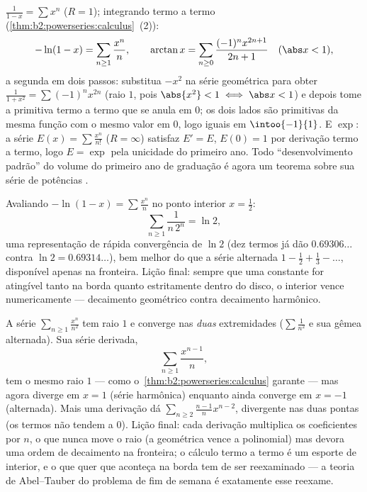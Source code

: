 \begin{example}\label{ex:b2:powerseries:classics}
$\displaystyle\frac{1}{1 - x} = \sum x^n$ ($R = 1$); integrando
termo a termo (\cref{thm:b2:powerseries:calculus}~(2)):
\[
-\ln(1 - x) = \sum_{n\geq1} \frac{x^n}{n},
\qquad
\arctan x = \sum_{n \geq 0} \frac{(-1)^n x^{2n+1}}{2n+1}
\quad (\abs x < 1),
\]
a segunda em dois passos: substitua $-x^2$ na série
geométrica para obter $\frac{1}{1+x^2} = \sum(-1)^nx^{2n}$ (raio
$1$, pois $\abs{x^2} < 1 \iff \abs x < 1$) e depois tome a
primitiva termo a termo que se anula em $0$; os dois lados são
primitivas da mesma função com o mesmo valor em $0$,
logo iguais em $\intoo{-1}{1}$. E $\exp$:
a série $E(x) = \sum \frac{x^n}{n!}$ ($R = \infty$) satisfaz
$E' = E$, $E(0) = 1$ por derivação termo a termo, logo $E = \exp$ pela
unicidade do primeiro ano. Todo ``desenvolvimento padrão'' do volume do primeiro
ano de graduação é agora um teorema sobre sua série de potências .
\end{example}

\begin{example}\label{ex:b2:powerseries:lntwo}
Avaliando $-\ln(1-x) = \sum\frac{x^n}{n}$ no ponto
interior $x = \frac12$:
\[
\sum_{n\geq1}\frac{1}{n\,2^n} = \ln 2 ,
\]
uma representação de rápida convergência de $\ln 2$ (dez termos já
dão $0.69306\ldots$ contra $\ln 2 = 0.69314\ldots$), bem
melhor do que a série alternada $1 - \frac12 + \frac13 -
\dots$, disponível apenas na fronteira. Lição final:
sempre que uma constante for atingível tanto na borda quanto estritamente
dentro do disco, o interior vence numericamente --- decaimento
geométrico contra decaimento harmônico.
\end{example}

\begin{example}\label{ex:b2:powerseries:boundaryloss}
A série $\sum_{n\geq1}\frac{x^n}{n^2}$ tem raio $1$ e
converge nas \emph{duas} extremidades ($\sum\frac1{n^2}$ e sua
gêmea alternada). Sua série derivada,
\[
\sum_{n\geq1}\frac{x^{n-1}}{n} ,
\]
tem o mesmo raio $1$ --- como
o~\cref{thm:b2:powerseries:calculus} garante --- mas agora
diverge em $x = 1$ (série harmônica) enquanto ainda converge
em $x = -1$ (alternada). Mais uma derivação dá
$\sum_{n\geq2}\frac{n-1}{n}x^{n-2}$, divergente nas duas pontas
(os termos não tendem a $0$). Lição final: cada
derivação multiplica os coeficientes por $n$, o que
nunca move o raio (a geométrica vence a polinomial) mas devora
uma ordem de decaimento na fronteira; o cálculo termo a termo é um
esporte de interior, e o que quer que aconteça na borda tem de ser
reexaminado --- a teoria de Abel--Tauber do problema de fim de semana é
exatamente esse reexame.
\end{example}

